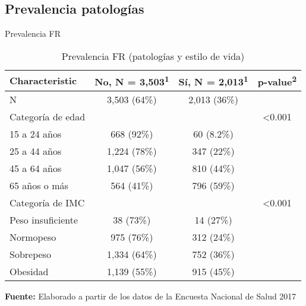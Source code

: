 \documentclass[aspectratio=169]{beamer}
\begin{document}
\subsection*{Prevalencia patologías}
\begin{frame}{Prevalencia FR}
\begin{table}[]
\caption{\small \small Prevalencia FR (patologías y estilo de vida)}
    \centering
    \small

    \captionsetup[table]{labelformat=empty,skip=1pt}
\begin{tabular}{lccc}
\toprule
\textbf{Characteristic} & \textbf{No}, N = 3,503\textsuperscript{1} & \textbf{Sí}, N = 2,013\textsuperscript{1} & \textbf{p-value}\textsuperscript{2} \\ 
\midrule
N & 3,503 (64\%) & 2,013 (36\%) &  \\ 
Categoría de edad &  &  & <0.001 \\ 
\-\hspace{5mm} \small 15 a 24 años & 668 (92\%) & 60 (8.2\%) &  \\ 
\-\hspace{5mm} \small 25 a 44 años & 1,224 (78\%) & 347 (22\%) &  \\ 
\-\hspace{5mm} \small 45 a 64 años & 1,047 (56\%) & 810 (44\%) &  \\ 
\-\hspace{5mm} \small 65 años o más & 564 (41\%) & 796 (59\%) &  \\ 
Categoría de IMC &  &  & <0.001 \\ 
\-\hspace{5mm} \small Peso insuficiente & 38 (73\%) & 14 (27\%) &  \\ 
\-\hspace{5mm} \small Normopeso & 975 (76\%) & 312 (24\%) &  \\ 
\-\hspace{5mm} \small Sobrepeso & 1,334 (64\%) & 752 (36\%) &  \\ 
\-\hspace{5mm} \small Obesidad & 1,139 (55\%) & 915 (45\%) &  \\ 
 \bottomrule
\end{tabular}
    \vspace{5mm}
    
    {\raggedright \small \textbf{Fuente:} Elaborado a partir de los datos de la Encuesta Nacional de Salud 2017 \par}
\end{table}
\end{frame}
\end{document}
